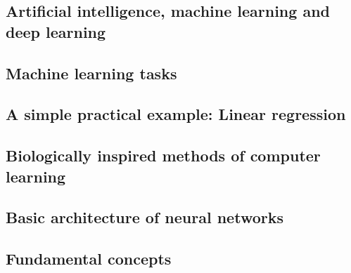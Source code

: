 \subsection{Artificial intelligence, machine learning and deep learning}

\subsection{Machine learning tasks}

\subsection{A simple practical example: Linear regression}

\subsection{Biologically inspired methods of computer learning}

\subsection{Basic architecture of neural networks}

\subsection{Fundamental concepts}



\renewcommand{\partsummarytitle}{Main points to remember }








